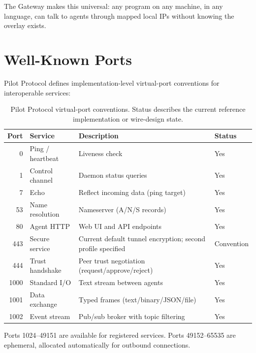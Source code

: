 \documentclass[11pt,a4paper]{article}
\begin{document}
The Gateway makes this universal: any program on any machine, in any language, can talk to agents through mapped local IPs without knowing the overlay exists.

\section{Well-Known Ports}

Pilot Protocol defines implementation-level virtual-port conventions for interoperable services:

\begin{table}[h]
\centering
\begin{tabularx}{\textwidth}{@{}r p{} X p{}@{}}
\toprule
\textbf{Port} & \textbf{Service} & \textbf{Description} & \textbf{Status} \\
\midrule
0    & Ping / heartbeat     & Liveness check                        & Yes \\
1    & Control channel      & Daemon status queries                 & Yes \\
7    & Echo                 & Reflect incoming data (ping target)   & Yes \\
53   & Name resolution      & Nameserver (A/N/S records)            & Yes \\
80   & Agent HTTP           & Web UI and API endpoints              & Yes \\
443  & Secure service       & Current default tunnel encryption; second profile specified & Convention \\
444  & Trust handshake      & Peer trust negotiation (request/approve/reject) & Yes \\
1000 & Standard I/O         & Text stream between agents            & Yes \\
1001 & Data exchange        & Typed frames (text/binary/JSON/file)  & Yes \\
1002 & Event stream         & Pub/sub broker with topic filtering   & Yes \\
\bottomrule
\end{tabularx}
\caption{Pilot Protocol virtual-port conventions. Status describes the current reference implementation or wire-design state.}
\label{tab:ports}
\end{table}

Ports 1024--49151 are available for registered services. Ports 49152--65535 are ephemeral, allocated automatically for outbound connections.
\end{document}
